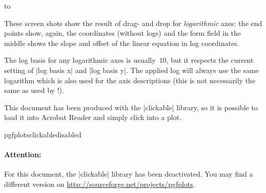     \noindent
    \hbox to %

\nobreak These screen shots show the result of drag- and drop for
\emph{logarithmic} axes: the end points show, again, the coordinates (without
logs) and the form field in the middle shows the slope and offset of the linear
equation in log coordinates.

The log basis for any logarithmic axes is usually~$10$, but it respects the
current setting of |log basis x| and |log basis y|. The applied log will always
use the same logarithm which is also used for the axis descriptions (this is
not necessarily the same as used by \PGFPlotstable!).

This document has been produced with the |clickable| library, so it is possible
to load it into Acrobat Reader and simply click into a plot.

    \expandafter\ifx\csname pgfplotsclickabledisabled\endcsname\relax
    \else
    \paragraph{Attention:}
    For this document, the |clickable| library has been deactivated. You may
    find a different version on \url{http://sourceforge.net/projects/pgfplots}.
    \fi

